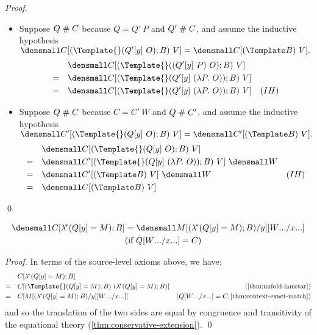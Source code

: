 \begin{proof}
\begin{itemize}
  \item Suppose $Q \mathrel{\#} C$ because $Q = Q' ~ P$ and $Q' \mathrel{\#} C$, and assume the inductive hypothesis
    \begin{math}
      \den{C[(\Template{} (Q'[y] ~ O); B) ~ V]} = \den{C[(\Template B) ~ V]}
      .
    \end{math}
    \begin{align*}
      & \quad \den{C[(\Template{} ((Q'[y] ~P) ~ O); B) ~ V]} \\
      =& \quad \den{C[(\Template{} (Q'[y] ~ (\lambda P. ~O)); B) ~ V]} \\
      =& \quad \den{C[(\Template{} (Q'[y] ~ (\lambda P. ~O)); B) ~ V]} & (IH)
    \end{align*}
  \item Suppose $Q \mathrel{\#} C$ because $C = C' ~ W$ and  $Q \mathrel{\#} C'$, and assume the inductive hypothesis
    \begin{math}
      \den{C'[(\Template{} (Q[y] ~ O); B) ~ V]} = \den{C'[(\Template B) ~ V]}
      .
    \end{math}
    \begin{align*}
      & \quad \den{C[(\Template{} (Q[y] ~ O); B) ~ V]} \\
      =& \quad \den{C'[(\Template{} (Q[y] ~ (\lambda P. ~O)); B) ~ V]} ~\den{W}\\
      =& \quad \den{C'[(\Template B) ~ V]} ~\den{W} & (IH)\\
      =& \quad \den{C[(\Template B) ~ V]}
    \end{align*}
  \end{itemize}
  \qed
\end{proof}

\begin{lemma}
  \label{thm:context-lamstar-match}
  \begin{align*}
    \den{C[\lamstar (Q[y] = M); B]}
    &=
    \den{M\subst{y}{(\lamstar (Q[y] = M); B)}\subst{\many{x}}{\many{W}}}
    \\
    &(\text{if } Q\subst{\many{x}}{\many{W}} = C)
  \end{align*}
\end{lemma}
\begin{proof}
  In terms of the source-level axioms above, we have:
  \begin{align*}
    &\quad
    C[\lamstar (Q[y] = M); B]
    \\
    =&\quad
    C[(\Template{} (Q[y] = M); B)~(\lamstar (Q[y]=M); B)]
    &(\cref{thm:unfold-lamstar})
    \\
    =&\quad
    C[M\subst{y}{(\lamstar (Q[y]=M); B)}\subst{\many{x}}{\many{W}}]
    &(Q\subst{\many{x}}{\many{W}} = C, \cref{thm:context-exact-match})
  \end{align*}
  and so the translation of the two sides are equal by congruence and transitivity of the equational theory (\cref{thm:conservative-extension}).
  \qed
\end{proof}

